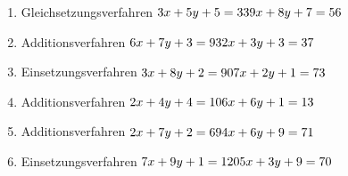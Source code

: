 \documentclass{article}%
\begin{document}
\begin{enumerate}[label=\alph*)]
\item%
Gleichsetzungsverfahren \newline\vspace{0.5cm} $3x+5y+5=33\newline9x+8y+7=56\newline$%
\item%
Additionsverfahren \newline\vspace{0.5cm} $6x+7y+3=93\newline2x+3y+3=37\newline$%
\item%
Einsetzungsverfahren \newline\vspace{0.5cm} $3x+8y+2=90\newline7x+2y+1=73\newline$%
\item%
Additionsverfahren \newline\vspace{0.5cm} $2x+4y+4=10\newline6x+6y+1=13\newline$%
\item%
Additionsverfahren \newline\vspace{0.5cm} $2x+7y+2=69\newline4x+6y+9=71\newline$%
\item%
Einsetzungsverfahren \newline\vspace{0.5cm} $7x+9y+1=120\newline5x+3y+9=70\newline$%
\end{enumerate}

%
\end{document}
